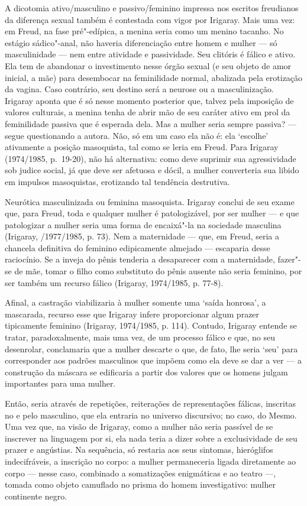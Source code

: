 A dicotomia ativo/masculino e passivo/feminino impressa nos escritos
freudianos da diferença sexual também é contestada com vigor por
Irigaray. Mais uma vez: em Freud, na fase pré"-edípica, a menina seria
como um menino tacanho. No estágio sádico"-anal, não haveria
diferenciação entre homem e mulher --- só masculinidade --- nem entre
atividade e passividade. Seu clitóris é fálico e ativo. Ela tem de
abandonar o investimento nesse órgão sexual (e seu objeto de amor
inicial, a mãe) para desembocar na feminilidade normal, abalizada pela
erotização da vagina. Caso contrário, seu destino será a neurose ou a
masculinização. Irigaray aponta que é só nesse momento posterior que,
talvez pela imposição de valores culturais, a menina tenha de abrir mão
de seu caráter ativo em prol da feminilidade passiva que é esperada
dela. Mas a mulher seria sempre passiva? --- segue questionando a autora.
Não, só em um caso ela não é: ela `escolhe' ativamente a posição
masoquista, tal como se leria em Freud. Para Irigaray (1974/1985,
p.~19-20), não há alternativa: como deve suprimir sua agressividade sob
judice social, já que deve ser afetuosa e dócil, a mulher converteria
sua libido em impulsos masoquistas, erotizando tal tendência destrutiva.

Neurótica masculinizada ou feminina masoquista. Irigaray conclui de seu
exame que, para Freud, toda e qualquer mulher é patologizável, por ser
mulher --- e que patologizar a mulher seria uma forma de encaixá"-la na
sociedade masculina (Irigaray, /1977/1985, p. 73). Nem a maternidade ---
que, em Freud, seria a chancela definitiva do feminino edipicamente
almejado --- escaparia desse raciocínio. Se a inveja do pênis tenderia a
desaparecer com a maternidade, fazer"-se de mãe, tomar o filho como
substituto do pênis ausente não seria feminino, por ser também um
recurso fálico (Irigaray, 1974/1985, p. 77-8).

Afinal, a castração viabilizaria à mulher somente uma `saída honrosa', a
mascarada, recurso esse que Irigaray infere proporcionar algum prazer
tipicamente feminino (Irigaray, 1974/1985, p. 114). Contudo, Irigaray
entende se tratar, paradoxalmente, mais uma vez, de um processo fálico e
que, no seu desenrolar, conclamaria que a mulher descarte o que, de
fato, lhe seria `seu' para corresponder aos padrões masculinos que
impõem como ela deve se dar a ver --- a construção da máscara se
edificaria a partir dos valores que os homens julgam importantes para
uma mulher.

Então, seria através de repetições, reiterações de representações
fálicas, inscritas no e pelo masculino, que ela entraria no universo
discursivo; no caso, do Mesmo. Uma vez que, na visão de Irigaray, como a
mulher não seria passível de se inscrever na linguagem por si, ela nada
teria a dizer sobre a exclusividade de seu prazer e angústias. Na
sequência, só restaria aos seus sintomas, hieróglifos indecifráveis, a
inscrição no corpo: a mulher permaneceria ligada diretamente ao corpo
--- nesse caso, combinado a somatizações enigmáticas e ao teatro ---,
tomada como objeto camuflado no prisma do homem investigativo: mulher
continente negro.

